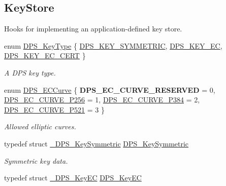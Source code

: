 \subsection*{Key\+Store}
\label{_amgrp4b5eecef069e79f508e3949bf0ecf75b}%
Hooks for implementing an application-\/defined key store. \begin{DoxyCompactItemize}
\item 
enum \hyperlink{group__keystore_ga7ca1045749c725e9c4a1b4758b2a0196}{D\+P\+S\+\_\+\+Key\+Type} \{ \hyperlink{group__keystore_gga7ca1045749c725e9c4a1b4758b2a0196a662c1e84628d96be8ae08163af382392}{D\+P\+S\+\_\+\+K\+E\+Y\+\_\+\+S\+Y\+M\+M\+E\+T\+R\+IC}, 
\hyperlink{group__keystore_gga7ca1045749c725e9c4a1b4758b2a0196a58453a89367757e523ac337232387d89}{D\+P\+S\+\_\+\+K\+E\+Y\+\_\+\+EC}, 
\hyperlink{group__keystore_gga7ca1045749c725e9c4a1b4758b2a0196a04e294e477af49e6a4927884f45fcb99}{D\+P\+S\+\_\+\+K\+E\+Y\+\_\+\+E\+C\+\_\+\+C\+E\+RT}
 \}\begin{DoxyCompactList}\small\item\em A D\+PS key type. \end{DoxyCompactList}
\item 
enum \hyperlink{group__keystore_ga9ba152af7a3ed9076bfa597ef918cac1}{D\+P\+S\+\_\+\+E\+C\+Curve} \{ {\bfseries D\+P\+S\+\_\+\+E\+C\+\_\+\+C\+U\+R\+V\+E\+\_\+\+R\+E\+S\+E\+R\+V\+ED} = 0, 
\hyperlink{group__keystore_gga9ba152af7a3ed9076bfa597ef918cac1a96cd27fcba408bafcdd33b83b0395ff8}{D\+P\+S\+\_\+\+E\+C\+\_\+\+C\+U\+R\+V\+E\+\_\+\+P256} = 1, 
\hyperlink{group__keystore_gga9ba152af7a3ed9076bfa597ef918cac1a359e576be45def67ea14b96c7bfbe100}{D\+P\+S\+\_\+\+E\+C\+\_\+\+C\+U\+R\+V\+E\+\_\+\+P384} = 2, 
\hyperlink{group__keystore_gga9ba152af7a3ed9076bfa597ef918cac1abb97d4a693a02becf44c12b6e4678724}{D\+P\+S\+\_\+\+E\+C\+\_\+\+C\+U\+R\+V\+E\+\_\+\+P521} = 3
 \}\begin{DoxyCompactList}\small\item\em Allowed elliptic curves. \end{DoxyCompactList}
\item 
typedef struct \hyperlink{struct___d_p_s___key_symmetric}{\+\_\+\+D\+P\+S\+\_\+\+Key\+Symmetric} \hyperlink{group__keystore_ga4c58e71301ab14e675033c601e4eabe1}{D\+P\+S\+\_\+\+Key\+Symmetric}
\begin{DoxyCompactList}\small\item\em Symmetric key data. \end{DoxyCompactList}\item 
typedef struct \hyperlink{struct___d_p_s___key_e_c}{\+\_\+\+D\+P\+S\+\_\+\+Key\+EC} \hyperlink{group__keystore_ga658140277e0cd5c6ccc3b7727ecaae8a}{D\+P\+S\+\_\+\+Key\+EC}

\end{DoxyCompactItemize}
